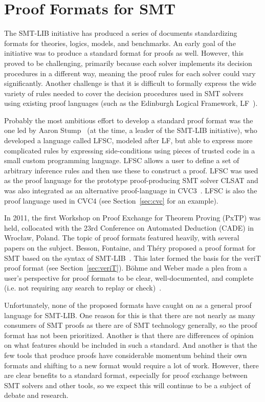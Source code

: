 \documentclass{llncs}
\begin{document}
\section{Proof Formats for SMT}
\label{sec:format}

The SMT-LIB initiative has produced a series of documents standardizing formats
for theories, logics, models, and benchmarks.  An early goal of the initiative
was to produce a standard format for proofs as well.  However, this proved to
be challenging, primarily because each solver implements its decision
procedures in a different way, meaning the proof rules for each solver could
vary significantly.  Another challenge is that it is difficult to formally
express the wide variety of rules needed to cover the decision procedures used
in SMT solvers using existing proof languages (such as the Edinburgh Logical
Framework, LF~\cite{HHP93}).

Probably the most ambitious effort to develop a standard proof format was the
one led by Aaron Stump~\cite{ORS09,SO08} (at the time, a leader of the SMT-LIB initiative), who
developed a language called LFSC, modeled after LF, but able to express more
complicated rules by expressing side-conditions using pieces of trusted
code in a small custom programming language.  LFSC allows a user to define a
set of arbitrary inference rules and then use these to construct a proof.  LFSC
was used as the proof language for the prototype proof-producing SMT
solver CLSAT and was also integrated as an alternative proof-language in
CVC3~\cite{SOR+13}.  LFSC is also the proof language used in CVC4 (see
Section~\ref{sec:cvc} for an example).

In 2011, the first Workshop on Proof Exchange for Theorem Proving (PxTP) was
held, collocated with the 23rd Conference on Automated Deduction (CADE) in
Wroc{\l}aw, Poland.  The topic of proof formats featured heavily, with several
papers on the subject.  Besson, Fontaine, and Th\'ery proposed a proof format
for SMT based on the syntax of SMT-LIB~\cite{BFT11}.  This later formed the basis for
the veriT proof format (see Section~\ref{sec:veriT}).  B\"ohme and Weber made a
plea from a user's perspective for proof formats to be clear, well-documented,
and complete (i.e. not requiring any search to replay or check)~\cite{BW11}.

Unfortunately, none of the proposed formats have caught on as a general proof
language for SMT-LIB.  One reason for this is that there are not nearly as many
consumers of SMT proofs as there are of SMT technology generally, so the proof
format has not been prioritized.  Another is that there are differences of
opinion on what features should be included in such a standard.  And another is
that the few tools that produce proofs have considerable momentum behind their
own formats and shifting to a new format would require a lot of work.  However,
there are clear benefits to a standard format, especially for proof exchange
between SMT solvers and other tools, so we expect this will continue to be a
subject of debate and research.
\end{document}
